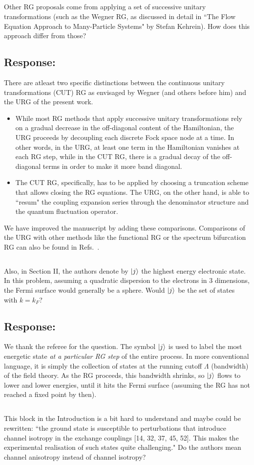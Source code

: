 \documentclass{article}
\newcommand{\response}[1]{{\color{blue}\subsection*{Response:}{#1}}}
\newcommand{\point}[1]{\subsection{}{#1}}
\begin{document}
\point{Other RG proposals come from applying a set of successive unitary transformations (such as the Wegner RG, as discussed in detail in ``The Flow Equation Approach to Many-Particle Systems" by Stefan Kehrein). How does this approach differ from those?}

\response{
There are atleast two specific distinctions between the continuous unitary transformations (CUT) RG as envisaged by Wegner (and others before him) and the URG of the present work.
\begin{itemize}
	\item While most RG methods that apply successive unitary transformations rely on a gradual decrease in the off-diagonal content of the Hamiltonian, the URG proceeds by decoupling each discrete Fock space node at a time. In other words, in the URG, at least one term in the Hamiltonian vanishes at each RG step, while in the CUT RG, there is a gradual decay of the off-diagonal terms in order to make it more band diagonal.
	\item The CUT RG, specifically, has to be applied by choosing a truncation scheme that allows closing the RG equations. The URG, on the other hand, is able to ``resum" the coupling expansion series through the denominator structure and the quantum fluctuation operator.  
\end{itemize}
We have improved the manuscript by adding these comparisons. Comparisons of the URG with other methods like the functional RG or the spectrum bifurcation RG can also be found in Refs.~\cite{anirbanmott1,anirbanurg1}.
}

\point{Also, in Section II, the authors denote by $\ket{j}$ the highest energy electronic state. In this problem, assuming a quadratic dispersion to the electrons in 3 dimensions, the Fermi surface would generally be a sphere. Would $\ket{j}$ be the set of states with $k=k_{F}$?}

\response{We thank the referee for the question. The symbol \(\ket{j}\) is used to label the most energetic state {\it at a particular RG step} of the entire process. In more conventional language, it is simply the collection of states at the running cutoff \(\Lambda\) (bandwidth) of the field theory. As the RG proceeds, this bandwidth shrinks, so \(\ket{j}\) flows to lower and lower energies, until it hits the Fermi surface (assuming the RG has not reached a fixed point by then).
}

\point{
This block in the Introduction is a bit hard to understand and maybe could be rewritten: ``the ground state is susceptible to perturbations that introduce channel isotropy in the exchange couplings [14, 32, 37, 45, 52]. This makes the experimental realisation of such states quite challenging." Do the authors mean channel anisotropy instead of channel isotropy?}
\end{document}
